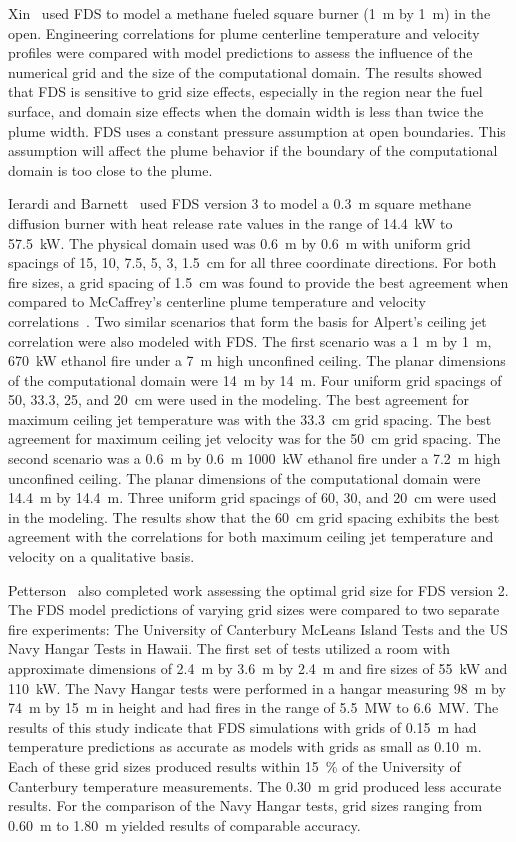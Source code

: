 \documentclass[11pt]{book}
\begin{document}
Xin~\cite{Xin:NFPA2004}  used FDS  to  model a  methane fueled  square burner (1~m  by 1~m) in  the open. Engineering correlations  for plume
centerline temperature and velocity  profiles were compared with model predictions to assess the influence of the numerical grid and the size of the
computational domain. The  results showed that FDS is sensitive to grid size effects, especially  in the region near the fuel surface, and domain
size  effects when the domain width is  less than twice the plume  width.  FDS  uses   a  constant  pressure  assumption  at  open boundaries.  This
assumption  will affect  the plume  behavior  if the boundary of the computational domain is too close to the plume.

Ierardi  and Barnett~\cite{Ierardi:1} used  FDS version  3 to  model a 0.3~m square methane diffusion burner with heat release rate values in the
range of 14.4~kW to 57.5~kW. The physical domain used was 0.6~m by 0.6~m with uniform grid spacings of  15, 10, 7.5, 5, 3, 1.5~cm for all three
coordinate  directions. For both  fire sizes, a grid  spacing of 1.5~cm  was found  to  provide  the best  agreement  when compared  to McCaffrey's
centerline    plume    temperature     and    velocity correlations~\cite{SFPE:Heskestad}.  Two similar  scenarios  that form the basis for Alpert's
ceiling  jet correlation were also modeled with FDS. The first scenario was a  1~m by 1~m, 670~kW ethanol fire under a 7~m   high  unconfined
ceiling.   The  planar   dimensions  of   the computational domain were 14~m by  14~m. Four uniform grid spacings of 50, 33.3, 25, and 20~cm were
used in the modeling. The best agreement for  maximum  ceiling  jet  temperature  was  with  the  33.3~cm  grid spacing. The best  agreement for
maximum ceiling jet  velocity was for the  50~cm grid  spacing. The  second scenario  was a  0.6~m  by 0.6~m 1000~kW ethanol fire under a 7.2~m high
unconfined ceiling. The planar dimensions of  the computational domain  were 14.4~m by  14.4~m. Three uniform  grid  spacings  of  60,  30,  and
20~cm  were  used  in  the modeling. The  results show that  the 60~cm grid spacing  exhibits the best  agreement with  the correlations  for both
maximum  ceiling jet temperature and velocity on a qualitative basis.

Petterson~\cite{Petterson:1} also completed work assessing the optimal grid size for FDS version 2. The FDS model predictions of varying grid sizes
were  compared to two separate fire  experiments: The University of Canterbury  McLeans Island  Tests and the  US Navy Hangar  Tests in Hawaii.  The
first  set  of  tests utilized  a  room with  approximate dimensions of  2.4~m by  3.6~m by  2.4~m and fire  sizes of  55~kW and 110~kW. The  Navy
Hangar  tests were performed  in a  hangar measuring 98~m by 74~m by 15~m in height and had fires in the range of 5.5~MW to 6.6~MW. The results  of
this study indicate that  FDS simulations with grids of 0.15~m had temperature predictions as accurate as models with grids as  small as 0.10~m. Each
of these grid  sizes produced results within   15~\%   of   the   University   of   Canterbury   temperature measurements. The 0.30~m grid  produced
less accurate results. For the comparison of the Navy Hangar tests, grid sizes ranging from 0.60~m to 1.80~m yielded results of comparable accuracy.
\end{document}
